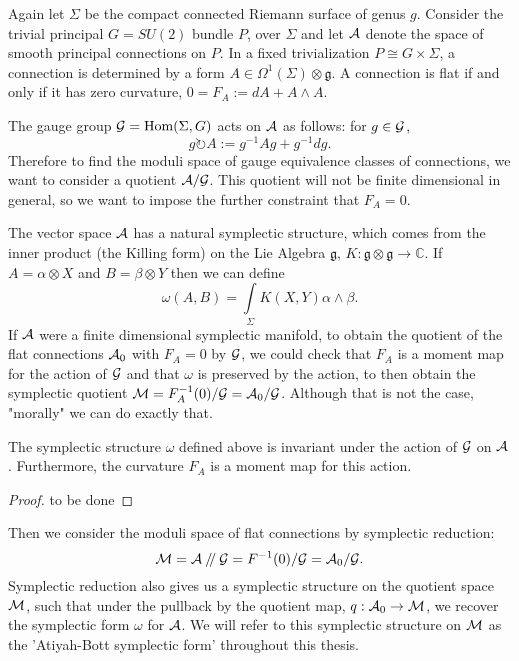	 Again let $\Sigma$ be the compact connected Riemann surface of genus $g$. Consider the trivial principal $G=SU(2)$ bundle $P$, over $\Sigma$ and let $\mathcal{A}$ denote the space of smooth principal connections on $P$. In a fixed trivialization $P \cong G\times \Sigma$, a connection is determined by a form $A \in \Omega^1(\Sigma)\otimes \mathfrak{g}$. A connection is flat if and only if it has zero curvature, $0 = F_A:= dA + A \wedge A$. 
	 
	 The gauge group $\mathcal{G} = \text{Hom}(\Sigma, G)$ acts on $\mathcal{A}$ as follows: for $g\in \mathcal{G}$,
	 \begin{equation}
	 g\circlearrowright A := g^{-1}Ag + g^{-1}dg.
	 \end{equation}
	 Therefore to find the moduli space of gauge equivalence classes of connections, we want to consider a quotient $\mathcal{A}/\mathcal{G}$. This quotient will not be finite dimensional in general, so we want to impose the further constraint that $F_A = 0$. 
	
	The vector space $\mathcal{A}$ has a natural symplectic structure, which comes from the inner product (the Killing form) on the Lie Algebra $\mathfrak{g}$, $K:\mathfrak{g}\otimes\mathfrak{g}\to\mathbb{C}$. If $A = \alpha \otimes X$ and $B = \beta \otimes Y$ then we can define
	\begin{equation}
	\omega(A,B) = \int\limits_\Sigma K(X,Y)\alpha\wedge \beta.
	\end{equation}
	If $\mathcal{A}$ were a finite dimensional symplectic manifold, to obtain the quotient of the flat connections $\mathcal{A}_0$ with $F_A =0$ by $\mathcal{G}$, we could check that $F_A$ is a moment map for the action of $\mathcal{G}$ and that $\omega$ is preserved by the action, to then obtain the symplectic quotient $\mathcal{M} = F_A^{-1}(0)/\mathcal{G} = \mathcal{A}_0/\mathcal{G}$. Although that is not the case, "morally" we can do exactly that.
	\begin{theorem}
		The symplectic structure $\omega$ defined above is invariant under the action of $\mathcal{G}$ on $\mathcal{A}$. Furthermore, the curvature $F_A$ is a moment map for this action.
	\end{theorem}
	\begin{proof}
	to be done
	\end{proof}
	Then we consider the moduli space of flat connections by symplectic reduction:
	\begin{equation}
	\mathcal{M} = \mathcal{A}\mathbin{/\mkern-4mu/}\mathcal{G} = F^{-1}(0)/ \mathcal{G}= \mathcal{A}_0/ \mathcal{G}.
	\end{equation} 
	Symplectic reduction also gives us a symplectic structure on the quotient space $\mathcal{M}$, such that under the pullback by the quotient map, $q:\mathcal{A}_0 \to \mathcal{M}$, we recover the symplectic form $\omega$ for $\mathcal{A}$. We will refer to this symplectic structure on $\mathcal{M}$ as the 'Atiyah-Bott symplectic form' throughout this thesis.

